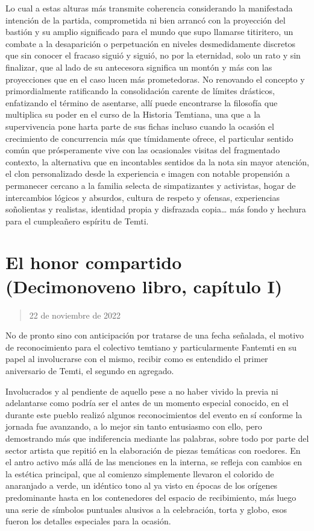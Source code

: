 \documentclass[
]{book}
\begin{document}
Lo cual a estas alturas más transmite coherencia considerando la manifestada intención de la partida, comprometida ni bien arrancó con la proyección del bastión y su amplio significado para el mundo que supo llamarse titiritero, un combate a la desaparición o perpetuación en niveles desmedidamente discretos que sin conocer el fracaso siguió y siguió, no por la eternidad, solo un rato y sin finalizar, que al lado de su antecesora significa un montón y más con las proyecciones que en el caso lucen más prometedoras. No renovando el concepto y primordialmente ratificando la consolidación carente de límites drásticos, enfatizando el término de asentarse, allí puede encontrarse la filosofía que multiplica su poder en el curso de la Historia Temtiana, una que a la supervivencia pone harta parte de sus fichas incluso cuando la ocasión el crecimiento de concurrencia más que tímidamente ofrece, el particular sentido común que prósperamente vive con las ocasionales visitas del fragmentado contexto, la alternativa que en incontables sentidos da la nota sin mayor atención, el clon personalizado desde la experiencia e imagen con notable propensión a permanecer cercano a la familia selecta de simpatizantes y activistas, hogar de intercambios lógicos y absurdos, cultura de respeto y ofensas, experiencias soñolientas y realistas, identidad propia y disfrazada copia\ldots{} más fondo y hechura para el cumpleañero espíritu de Temti.

\hypertarget{el-honor-compartido-decimonoveno-libro-capuxedtulo-i}{%
\section{El honor compartido (Decimonoveno libro, capítulo I)}\label{el-honor-compartido-decimonoveno-libro-capuxedtulo-i}}

\begin{quote}
22 de noviembre de 2022
\end{quote}

No de pronto sino con anticipación por tratarse de una fecha señalada, el motivo de reconocimiento para el colectivo temtiano y particularmente Fantemti en su papel al involucrarse con el mismo, recibir como es entendido el primer aniversario de Temti, el segundo en agregado.

Involucrados y al pendiente de aquello pese a no haber vivido la previa ni adelantarse como podría ser el antes de un momento especial conocido, en el durante este pueblo realizó algunos reconocimientos del evento en sí conforme la jornada fue avanzando, a lo mejor sin tanto entusiasmo con ello, pero demostrando más que indiferencia mediante las palabras, sobre todo por parte del sector artista que repitió en la elaboración de piezas temáticas con roedores. En el antro activo más allá de las menciones en la interna, se refleja con cambios en la estética principal, que al comienzo simplemente llevaron el colorido de anaranjado a verde, un idéntico tono al ya visto en épocas de los orígenes predominante hasta en los contenedores del espacio de recibimiento, más luego una serie de símbolos puntuales alusivos a la celebración, torta y globo, esos fueron los detalles especiales para la ocasión.
\end{document}
